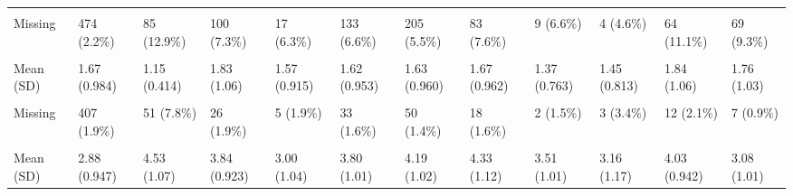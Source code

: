 \documentclass[
  single column]{article}
\begin{document}
\begin{landscape}
\begin{longtable}[t]{llllllllllll}
\cellcolor{gray!10}{Median [Min, Max]} & \cellcolor{gray!10}{3.00 [1.00, 7.00]} & \cellcolor{gray!10}{4.00 [1.00, 7.00]} & \cellcolor{gray!10}{4.00 [1.00, 7.00]} & \cellcolor{gray!10}{3.00 [1.00, 7.00]} & \cellcolor{gray!10}{4.00 [1.00, 7.00]} & \cellcolor{gray!10}{4.00 [1.00, 7.00]} & \cellcolor{gray!10}{4.00 [1.00, 7.00]} & \cellcolor{gray!10}{3.00 [1.00, 7.00]} & \cellcolor{gray!10}{3.00 [1.00, 7.00]} & \cellcolor{gray!10}{4.00 [1.00, 7.00]} & \cellcolor{gray!10}{3.00 [1.00, 7.00]}\\
\addlinespace
Missing & 474 (2.2\%) & 85 (12.9\%) & 100 (7.3\%) & 17 (6.3\%) & 133 (6.6\%) & 205 (5.5\%) & 83 (7.6\%) & 9 (6.6\%) & 4 (4.6\%) & 64 (11.1\%) & 69 (9.3\%)\\
\cellcolor{gray!10}{Rurality Classification (GCH 2018 Level)} & \cellcolor{gray!10}{} & \cellcolor{gray!10}{} & \cellcolor{gray!10}{} & \cellcolor{gray!10}{} & \cellcolor{gray!10}{} & \cellcolor{gray!10}{} & \cellcolor{gray!10}{} & \cellcolor{gray!10}{} & \cellcolor{gray!10}{} & \cellcolor{gray!10}{} & \cellcolor{gray!10}{}\\
Mean (SD) & 1.67 (0.984) & 1.15 (0.414) & 1.83 (1.06) & 1.57 (0.915) & 1.62 (0.953) & 1.63 (0.960) & 1.67 (0.962) & 1.37 (0.763) & 1.45 (0.813) & 1.84 (1.06) & 1.76 (1.03)\\
\cellcolor{gray!10}{Median [Min, Max]} & \cellcolor{gray!10}{1.00 [1.00, 5.00]} & \cellcolor{gray!10}{1.00 [1.00, 4.00]} & \cellcolor{gray!10}{1.00 [1.00, 5.00]} & \cellcolor{gray!10}{1.00 [1.00, 5.00]} & \cellcolor{gray!10}{1.00 [1.00, 5.00]} & \cellcolor{gray!10}{1.00 [1.00, 5.00]} & \cellcolor{gray!10}{1.00 [1.00, 5.00]} & \cellcolor{gray!10}{1.00 [1.00, 4.00]} & \cellcolor{gray!10}{1.00 [1.00, 4.00]} & \cellcolor{gray!10}{1.00 [1.00, 5.00]} & \cellcolor{gray!10}{1.00 [1.00, 5.00]}\\
Missing & 407 (1.9\%) & 51 (7.8\%) & 26 (1.9\%) & 5 (1.9\%) & 33 (1.6\%) & 50 (1.4\%) & 18 (1.6\%) & 2 (1.5\%) & 3 (3.4\%) & 12 (2.1\%) & 7 (0.9\%)\\
\addlinespace
\cellcolor{gray!10}{Right-Wing Authoritarianism} & \cellcolor{gray!10}{} & \cellcolor{gray!10}{} & \cellcolor{gray!10}{} & \cellcolor{gray!10}{} & \cellcolor{gray!10}{} & \cellcolor{gray!10}{} & \cellcolor{gray!10}{} & \cellcolor{gray!10}{} & \cellcolor{gray!10}{} & \cellcolor{gray!10}{} & \cellcolor{gray!10}{}\\
Mean (SD) & 2.88 (0.947) & 4.53 (1.07) & 3.84 (0.923) & 3.00 (1.04) & 3.80 (1.01) & 4.19 (1.02) & 4.33 (1.12) & 3.51 (1.01) & 3.16 (1.17) & 4.03 (0.942) & 3.08 (1.01)\\

\end{longtable}
\end{landscape}
\end{document}
